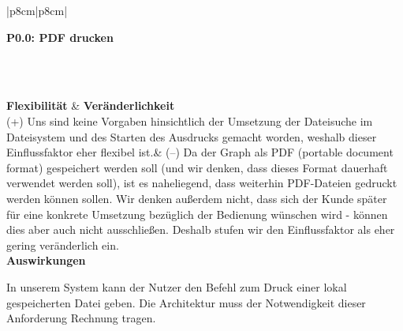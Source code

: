 \documentclass[enabledeprecatedfontcommands,fontsize=11pt,paper=a4,twoside]{scrartcl}
\newcounter{one}
\newcounter{two}[one]
\newcommand{\tone}{0\theone}
\newcommand{\two}{\stepcounter{two}0\thetwo}
\begin{document}
\begin{tabular} {|p{8cm}|p{8cm}|}
	\hline
	 {\parbox{16cm}{\textbf{\hypertarget{ll}{P\tone.\two}: PDF drucken}} } \\  \hline\hline 
	\rule{0pt}{4ex}\\ [2ex] \hline
	\textbf{Flexibilität}  & \textbf{Veränderlichkeit} \\
	(+) Uns sind keine Vorgaben hinsichtlich der Umsetzung der Dateisuche im Dateisystem und des Starten des Ausdrucks gemacht worden, weshalb dieser Einflussfaktor eher flexibel ist.& 
	(–) Da der Graph als PDF (portable document format) gespeichert werden soll (und wir denken, dass dieses Format dauerhaft verwendet werden soll), ist es naheliegend, dass weiterhin PDF-Dateien gedruckt werden können sollen. Wir denken außerdem nicht, dass sich der Kunde später für eine konkrete Umsetzung bezüglich der Bedienung wünschen wird - können dies aber auch nicht ausschließen. Deshalb stufen wir den Einflussfaktor als eher gering veränderlich ein.\\
	\hline
	 {\textbf{Auswirkungen}} \\
	 {\parbox{16cm}{In unserem System kann der Nutzer den Befehl zum Druck einer lokal gespeicherten Datei geben. Die Architektur muss der Notwendigkeit dieser Anforderung Rechnung tragen.} }\\ \hline
\end{tabular}
\\ \\ \\ \\ \\
\end{document}
